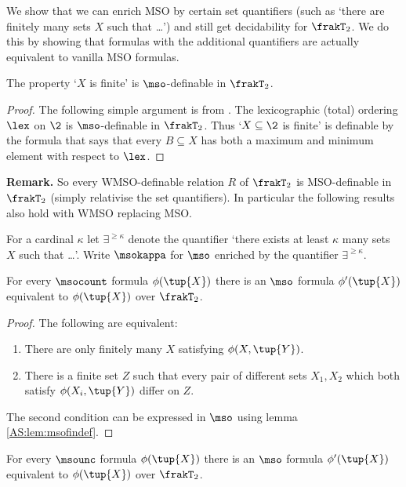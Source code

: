 We show that we can enrich MSO by certain set quantifiers (such as `there are finitely many sets $X$ such that \dots')
and still get decidability  for $\frakT_2$. We do this by showing that formulas with the additional quantifiers are actually equivalent to vanilla MSO formulas. 

\begin{lemma} \label{AS:lem:msofindef}
The property `$X$ is finite' is $\mso$-definable in $\frakT_2$.
\end{lemma}

\begin{proof}
The following simple argument is from \cite{Rabi69}.
The lexicographic (total) ordering $\lex$ on $\2$ is $\mso$-definable in $\frakT_2$.
Thus `$X \subseteq \2$ is finite' is definable by the formula that says that every $B \subseteq X$ has
both a maximum and minimum element with respect to $\lex$.
\end{proof}

{\bf Remark.} So every WMSO-definable relation $R$ of $\frakT_2$ is MSO-definable in $\frakT_2$ 
(simply relativise the set quantifiers). In particular the following results also hold with WMSO replacing MSO.

For a cardinal $\kappa$ let $\exists^{\geq \kappa}$ denote the quantifier `there exists at least $\kappa$ many sets $X$ such that \dots'.
Write $\msokappa$ for $\mso$ enriched by the quantifier $\exists^{\geq \kappa}$. 

\begin{proposition} \cite{BKRa}
For every $\msocount$ formula $\phi(\tup{X})$ there is an $\mso$ formula 
$\phi'(\tup{X})$ equivalent to $\phi(\tup{X})$ over $\frakT_2$.
\end{proposition}

\begin{proof}
The following are equivalent:
\begin{enumerate}
\item There are only finitely many $X$ satisfying $\phi(X,\tup{Y})$. 
\item There is a finite set $Z$ such that every pair of different sets $X_1,X_2$ which both satisfy $\phi(X_i,\tup{Y})$ differ on $Z$.
\end{enumerate}
The second condition can be expressed in $\mso$ using lemma \ref{AS:lem:msofindef}.
\end{proof}

\begin{theorem} \cite{BKRa}
For every $\msounc$ formula $\phi(\tup{X})$ there is an $\mso$ formula
$\phi'(\tup{X})$ equivalent to $\phi(\tup{X})$ over $\frakT_2$.
\end{theorem}


